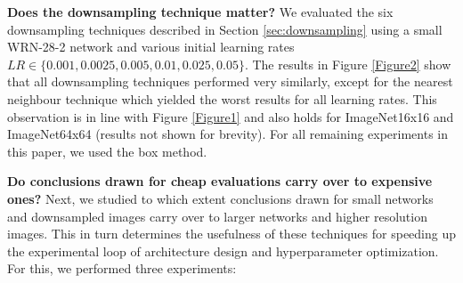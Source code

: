 \documentclass{article} \usepackage{iclr2017_conference,times}
\begin{document}
\textbf{Does the downsampling technique matter?} 
We evaluated the six downsampling techniques described in Section \ref{sec:downsampling} using a small WRN-28-2 network and various initial learning rates $LR \in \{0.001, 0.0025, 0.005, 0.01, 0.025, 0.05\}$. The results in Figure \ref{Figure2} show that all downsampling techniques performed very similarly, except for the nearest neighbour technique which yielded the worst results for all learning rates. This observation is in line with Figure \ref{Figure1} and also holds for ImageNet16x16 and ImageNet64x64 (results not shown for brevity). For all remaining experiments in this paper, we used the box method.

\textbf{Do conclusions drawn for cheap evaluations carry over to expensive ones?} 
Next, we studied to which extent conclusions drawn for small networks and downsampled images carry over to larger networks and higher resolution images. This in turn determines the usefulness of these techniques for speeding up the experimental loop of architecture design and hyperparameter optimization. For this, we performed three experiments:
\end{document}
